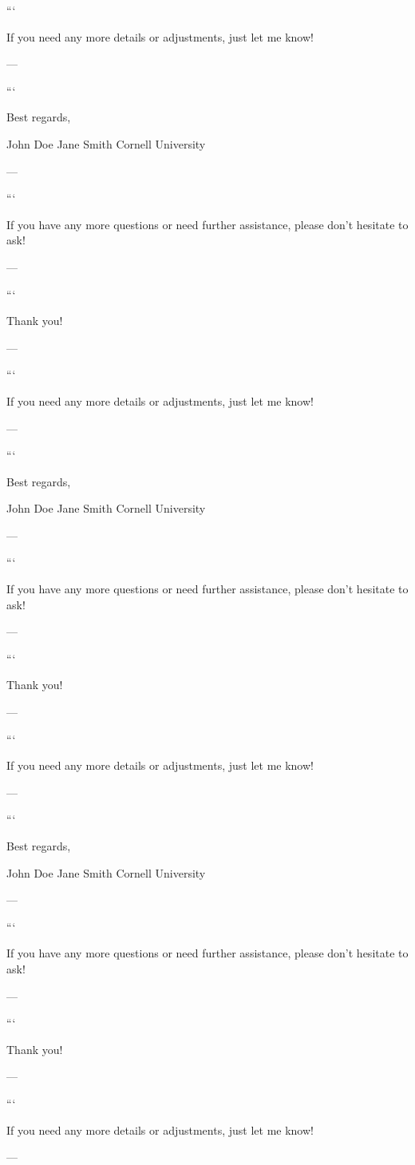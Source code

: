 ``` 

If you need any more details or adjustments, just let me know! 

--- 
 

``` 

Best regards, 

John Doe  
Jane Smith  
Cornell University  

--- 
 

``` 

If you have any more questions or need further assistance, please don't hesitate to ask! 

--- 
 

``` 

Thank you! 

--- 
 

``` 

If you need any more details or adjustments, just let me know! 

--- 
 

``` 

Best regards, 

John Doe  
Jane Smith  
Cornell University  

--- 
 

``` 

If you have any more questions or need further assistance, please don't hesitate to ask! 

--- 
 

``` 

Thank you! 

--- 
 

``` 

If you need any more details or adjustments, just let me know! 

--- 
 

``` 

Best regards, 

John Doe  
Jane Smith  
Cornell University  

--- 
 

``` 

If you have any more questions or need further assistance, please don't hesitate to ask! 

--- 
 

``` 

Thank you! 

--- 
 

``` 

If you need any more details or adjustments, just let me know! 

--- 
 

